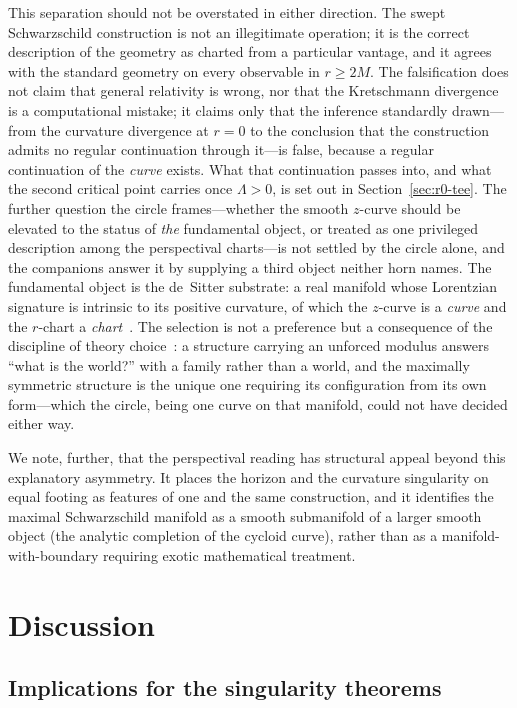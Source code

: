 \documentclass[11pt,a4paper]{article}
\theoremstyle{definition}
\begin{document}
This separation should not be overstated in either direction. The swept Schwarzschild construction is not an illegitimate operation; it is the correct description of the geometry as charted from a particular vantage, and it agrees with the standard geometry on every observable in $r \geq 2M$. The falsification does not claim that general relativity is wrong, nor that the Kretschmann divergence is a computational mistake; it claims only that the inference standardly drawn---from the curvature divergence at $r=0$ to the conclusion that the construction admits no regular continuation through it---is false, because a regular continuation of the \emph{curve} exists. What that continuation passes into,
and what the second critical point carries once $\Lambda>0$, is set out in
Section~\ref{sec:r0-tee}. The further question the circle frames---whether the smooth $z$-curve should be elevated to the status of \emph{the} fundamental object, or treated as one privileged description among the perspectival charts---is not settled by the circle alone, and the companions answer it by supplying a third object neither horn names. The fundamental object is the de~Sitter substrate: a real manifold whose Lorentzian signature is intrinsic to its positive curvature, of which the $z$-curve is a \emph{curve} and the $r$-chart a \emph{chart}~\cite{JanzenSlicing,JanzenGeometricCore}. The selection is not a preference but a consequence of the discipline of theory choice~\cite{JanzenShadowExistence}: a structure carrying an unforced modulus answers ``what is the world?'' with a family rather than a world, and the maximally symmetric structure is the unique one requiring its configuration from its own form---which the circle, being one curve on that manifold, could not have decided either way.

We note, further, that the perspectival reading has structural appeal beyond this explanatory asymmetry. It places the horizon and the curvature singularity on equal footing as features of one and the same construction, and it identifies the maximal Schwarzschild manifold as a smooth submanifold of a larger smooth object (the analytic completion of the cycloid curve), rather than as a manifold-with-boundary requiring exotic mathematical treatment.

\section{Discussion}\label{sec:discussion}

\subsection{Implications for the singularity theorems}
\end{document}
